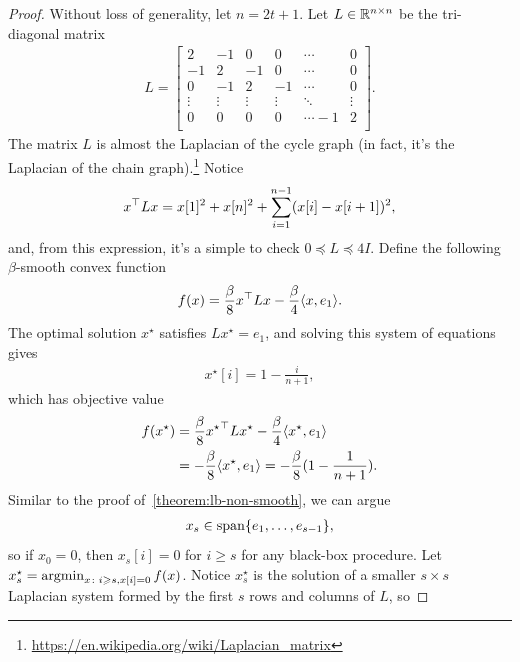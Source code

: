 \begin{proof}
Without loss of generality, let $n = 2t+1$.
Let $L \in \mathbb{R}^{n \times n}$ be the tri-diagonal matrix
\begin{align*}
    L =
    \begin{bmatrix}
        2 & -1 & 0 & 0 & \cdots & 0 \\
        -1 & 2 & -1 & 0 & \cdots & 0 \\
        0 & -1 & 2 & -1  & \cdots & 0 \\
        \vdots & \vdots & \vdots & \vdots & \ddots & \vdots \\
        0 & 0 & 0 & 0 & \cdots -1 & 2  \\
    \end{bmatrix}.
\end{align*}
The matrix $L$ is almost the Laplacian of the cycle
graph (in fact, it's the Laplacian of the chain graph).\footnote{\url{https://en.wikipedia.org/wiki/Laplacian_matrix}}
Notice
\begin{align*}
    x^\top L x = x[1]^2 + x[n]^2 + \sum_{i=1}^{n-1} (x[i] - x[i+1])^2,
\end{align*}
and, from this expression, it's a simple to check
$0 \preceq L \preceq 4I$.
Define the following $\beta$-smooth convex function
\begin{align*}
    f(x) = \frac{\beta}{8} x^\top L x - \frac{\beta}{4}\langle x, e_1 \rangle.
\end{align*}
The optimal solution $x^\star$ satisfies $Lx^\star = e_1$, and solving this 
system of equations gives
\begin{align*}
    x^\star[i] = 1 - \frac{i}{n+1},
\end{align*}
which has objective value
\begin{align*}
    f(x^\star)
    &=  \frac{\beta}{8} {x^\star}^\top L x^\star - \frac{\beta}{4}\langle
    x^\star, e_1 \rangle \\
    &= -\frac{\beta}{8} \langle x^\star, e_1 \rangle
    = -\frac{\beta}{8} (1 - \frac{1}{n+1} ).
\end{align*}
Similar to the proof of~\eqref{theorem:lb-non-smooth}, we can argue
\begin{align*}
    x_s \in \mathop{\rm span}\{e_1, \dots, e_{s-1}\},
\end{align*}
so if $x_0 = 0$, then $x_s[i] = 0$ for $i \geq s$ for any black-box procedure.
Let $x_s^\star = \mathop{\rm argmin}_{x \colon i\geqslant s, x[i] = 0} f(x)$. Notice $x_s^\star$
is the solution of a smaller $s \times s$ Laplacian system formed by the
first $s$ rows and columns of $L$, so

\end{proof}

